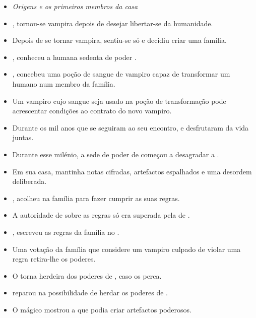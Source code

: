 \MMRelationshipMapHeading
\begin{itemize}
  \item[] \textit{Origens e os primeiros membros da casa}

  \item {},  tornou-se vampira depois de desejar libertar-se da humanidade.
  \item Depois de se tornar vampira,  sentiu-se só e decidiu criar uma família.
  \item {},  conheceu a humana sedenta de poder .
  \item {},  concebeu uma poção de sangue de vampiro capaz de transformar um humano num membro da família.
  \item Um vampiro cujo sangue seja usado na poção de transformação pode acrescentar condições ao contrato do novo vampiro.
  \item Durante os mil anos que se seguiram ao seu encontro,  e  desfrutaram da vida juntas.
  \item Durante esse milénio, a sede de poder de  começou a desagradar a .
  \item Em sua casa,  mantinha notas cifradas, artefactos espalhados e uma desordem deliberada.
  \item {},  acolheu  na família para fazer cumprir as suas regras.
  \item A autoridade de  sobre as regras só era superada pela de .
  \item {},  escreveu as regras da família no .
  \item Uma votação da família que considere um vampiro culpado de violar uma regra retira-lhe os poderes.
  \item O  torna  herdeira dos poderes de , caso  os perca.
  \item {} reparou na possibilidade de herdar os poderes de .
  \item O  mágico mostrou a  que  podia criar artefactos poderosos.

\end{itemize}
